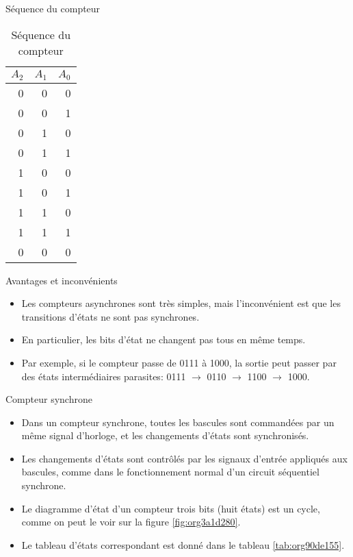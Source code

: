 \documentclass[presentation]{beamer}
\begin{document}
\begin{frame}[label={sec:org3cead5d}]{Séquence du compteur}
\begin{table}[htbp]
\caption{\label{tab:orgf195205}Séquence du compteur}
\centering
\begin{tabular}{rrr}
\(A_2\) & \(A_1\) & \(A_0\)\\
\hline
0 & 0 & 0\\
0 & 0 & 1\\
0 & 1 & 0\\
0 & 1 & 1\\
1 & 0 & 0\\
1 & 0 & 1\\
1 & 1 & 0\\
1 & 1 & 1\\
0 & 0 & 0\\
\end{tabular}
\end{table}
\end{frame}

\begin{frame}[label={sec:orgfc820fc}]{Avantages et inconvénients}
\begin{itemize}
\item Les compteurs asynchrones sont très simples, mais l'inconvénient est que les transitions d'états ne sont pas synchrones.

\item En particulier, les bits d'état ne changent pas tous en même temps.

\item Par exemple, si le compteur passe de 0111 à 1000, la sortie peut passer par des états intermédiaires parasites: 0111 \(\rightarrow\) 0110 \(\rightarrow\) 1100 \(\rightarrow\) 1000.
\end{itemize}
\end{frame}

\begin{frame}[label={sec:orge1f40e9}]{Compteur synchrone}
\begin{itemize}
\item Dans un compteur synchrone, toutes les bascules sont commandées par un même signal d'horloge, et les changements d'états sont synchronisés.

\item Les changements d'états sont contrôlés par les signaux d'entrée appliqués aux bascules, comme dans le fonctionnement normal d'un circuit séquentiel synchrone.

\item Le diagramme d'état d'un compteur trois bits (huit états) est un cycle, comme on peut le voir sur la figure \ref{fig:org3a1d280}.

\item Le tableau d'états correspondant est donné dans le tableau \ref{tab:org90de155}.
\end{itemize}
\end{frame}
\end{document}
